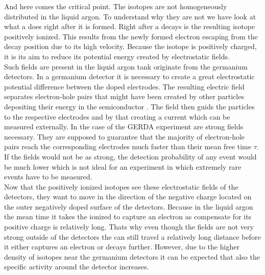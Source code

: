 \documentclass[encoding=utf8,british]{tumphthesis}
\begin{document}
And here comes the critical point.
The  isotopes are not homogeneously distributed in the liquid argon.
To understand why they are not we have look at what a  does right after it is formed.
Right after a  decays is the resulting  isotope positively ionized.
This results from the newly formed electron escaping from the decay position due to its high velocity.
Because the  isotope is positively charged, it is its aim to reduce its potential energy created by electrostatic fields.
\\

Such fields are present in the liquid argon tank originate from the germanium detectors.
In a germanium detector it is necessary to create a great electrostatic potential difference between the doped electrodes.
The resulting electric field separates electron-hole pairs that might have been created by other particles depositing their energy in the semiconductor \cite{spieler_semiconductor_2005}.
The field then guids the particles to the respective electrodes and by that creating a current which can be measured externally.
In the case of the GERDA experiment are strong fields necessary.
They are supposed to guarantee that the majority of electron-hole pairs reach the corresponding electrodes much faster than their mean free time $\tau$. %
If the fields would not be as strong, the detection probability of any event would be much lower which is not ideal for an experiment in which extremely rare events have to be measured.
\\

Now that the positively ionized isotopes see these electrostatic fields of the detectors, they want to move in the direction of the negative charge located on the outer negatively doped surface of the detectors.
Because in the liquid argon the mean time it takes the ionized  to capture an electron as compensate for its positive charge is relatively long. %
Thats why even though the fields are not very strong outside of the detectors the  can still travel a relatively long distance before it either captures an electron or decays further. 
However, due to the higher density of  isotopes near the germanium detectors it can be expected that also the specific activity around the detector increases.
\\
\end{document}
